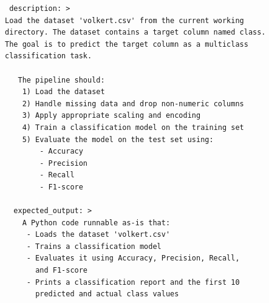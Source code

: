 \begin{tcolorbox}[ left=2pt,   right=2pt,   top=2pt,   bottom=2pt, colback=gray!5,colframe=black!40,title={Initial prompt (No Expertise)}]
\scriptsize
\setlength{\baselineskip}{0.6\baselineskip} \begin{verbatim}
 description: >
Load the dataset 'volkert.csv' from the current working 
directory. The dataset contains a target column named class.
The goal is to predict the target column as a multiclass 
classification task.

   The pipeline should:
    1) Load the dataset
    2) Handle missing data and drop non-numeric columns
    3) Apply appropriate scaling and encoding
    4) Train a classification model on the training set
    5) Evaluate the model on the test set using:
        - Accuracy
        - Precision
        - Recall
        - F1-score

  expected_output: >
    A Python code runnable as-is that:
     - Loads the dataset 'volkert.csv'
     - Trains a classification model
     - Evaluates it using Accuracy, Precision, Recall, 
       and F1-score
     - Prints a classification report and the first 10 
       predicted and actual class values
\end{verbatim}
\end{tcolorbox}


